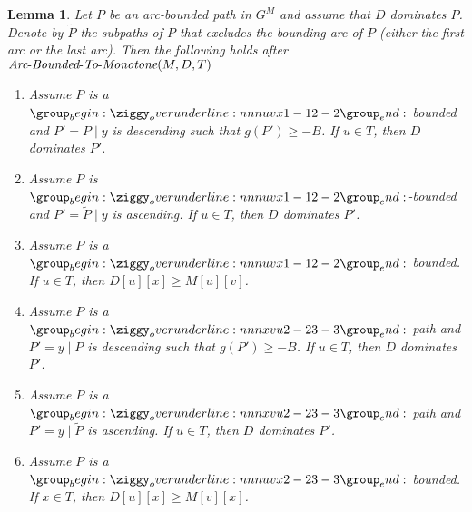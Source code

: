 \documentclass[11pt]{article}
\newtheorem{lemma}[theorem]{Lemma}
\newcommand{\Extend}{\mbox{{\it Arc}-{\it Bounded}-{\it To}-{\it Monotone}}}
\begin{document}
\begin{lemma}\label{lemma:long-shortcuts-dominating}
   Let $P$ be an arc-bounded path in $G^M$ and assume that $D$ dominates $P$. Denote by $\tilde{P}$ the subpaths of $P$ that excludes the bounding arc of $P$ (either the first arc or the last arc). Then the following holds after $\Extend(M,D,T)$
    \begin{enumerate}
        \item Assume $P$ is a $\overunderline{uvx}{1-1}{2-2}$ bounded and $P' = P\mid y $ is descending such that $g(P')\ge -B$. If $u \in T$, then $D$ dominates $P'$.
        \item Assume $P$ is $\overunderline{uvx}{1-1}{2-2}$-bounded and $P' = \tilde{P}\mid y $ is ascending. If $u \in T$, then $D$ dominates $P'$.
        \item  Assume $P$ is a $\overunderline{uvx}{1-1}{2-2}$ bounded. If $u \in T$, then $D[u][x]\ge M[u][v]$.
        \item Assume $P$ is a $\overunderline{xvu}{2-2}{3-3}$ path and $P' = y \mid P $ is descending such that $g(P')\ge -B$. If $u \in T$, then $D$ dominates $P'$.
        \item Assume $P$ is a $\overunderline{xvu}{2-2}{3-3}$ path and $P' = y \mid \tilde{P} $ is ascending. If $u \in T$, then $D$ dominates $P'$.
        \item Assume $P$ is a $\overunderline{uvx}{2-2}{3-3}$ bounded. If $x \in T$, then $D[u][x]\ge M[v][x]$.
    \end{enumerate}
\end{lemma}
\end{document}
